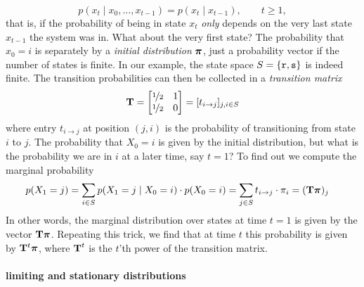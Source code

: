 \documentclass{../src/bcthesispart}
\begin{document}
\begin{equation}
	\label{eq:markov-assumption}
	p(x_t \mid x_0, \dots, x_{t-1}) = p(x_t \mid x_{t-1}), \qquad t\ge 1,
\end{equation}
that is, if the probability of being in state $x_t$ \emph{only} depends on the very last state $x_{t-1}$ the system was in.
What about the very first state?
The probability that $x_0 = i$ is separately by a \emph{initial distribution} $\boldsymbol{\mathbf{\pi}}$, just a probability vector if the number of states is finite.
In our example, the state space $S = \{\texttt{r}, \texttt{s}\}$ is indeed finite. 
The transition probabilities can then be collected in a \emph{transition matrix}
\begin{equation}
	\mathbf{T} 
		= \begin{bmatrix}\nicefrac{1}{2} & 1\\\nicefrac{1}{2} & 0\end{bmatrix}
		= [t_{i\to j}]_{j, i \in S}
\end{equation}
where entry $t_{i \to j}$ at position $(j,i)$ is the probability of transitioning from state $i$ to $j$.
The probability that $X_0 = i$ is given by the initial distribution, but what is the probability we are in $i$ at a later time, say $t=1$? 
To find out we compute the marginal probability
\begin{align*}
	p(X_1 = j) 
		&= \sum_{i\in S} p(X_1 = j \mid X_0 = i)\cdot p(X_0 = i)
		= \sum_{j\in S} t_{i\to j}\cdot \pi_i
		= (\mathbf{T}\boldsymbol{\mathbf{\pi}})_j
\end{align*}
In other words, the marginal distribution over states at time $t=1$ is given by the vector $\mathbf{T}\boldsymbol{\mathbf{\pi}}$.
Repeating this trick, we find that at time $t$ this probability is given by $\mathbf{T}^t\boldsymbol{\mathbf{\pi}}$, where $\boldsymbol{\mathbf{T}}^t$ is the $t$’th power of the transition matrix. 




\paragraph{limiting and stationary distributions}
\end{document}
